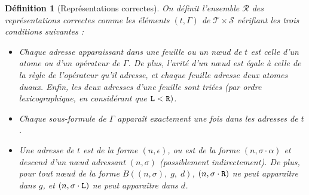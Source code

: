 \documentclass[11pt,a4paper]{article}
\newtheorem{definition}{Définition}
\newcommand*{\sequent}{\Gamma}
\newcommand*{\Left}{\textnormal{\texttt{L}}}
\newcommand*{\Right}{\textnormal{\texttt{R}}}
\newcommand*{\sequents}{\ensuremath{\mathcal{S}}}
\newcommand*{\trees}{\ensuremath{\mathcal{T}}}
\newcommand*{\representationslarge}{\ensuremath{\trees \times \sequents}}
\newcommand*{\representations}{\ensuremath{\mathcal{R}}}
\begin{document}
\begin{definition}[Représentations correctes]
    \label{def_rep}
    On définit l'ensemble \representations{} des représentations correctes comme les éléments $(t, \sequent)$ de $\representationslarge$ vérifiant les trois conditions suivantes :
    
    \begin{itemize}
    \item[(i) Bon adressage :]{ Chaque adresse apparaissant dans une feuille ou un n\oe ud de $t$ est celle d'un atome ou d'un opérateur de $\sequent$. De plus, l'arité d'un n\oe ud est égale à celle de la règle de l'opérateur qu'il adresse, et chaque feuille adresse deux atomes duaux. Enfin, les deux adresses d'une feuille sont triées (par ordre lexicographique, en considérant que $\Left < \Right)$.}
    
    \item[(ii) Linéarité :]{ Chaque sous-formule de $\sequent$ apparaît exactement une fois dans les adresses de $t$.}

    \item[(iii) Descendance :]{ Une adresse de $t$ est de la forme $(n, \epsilon)$, ou est de la forme $(n, \sigma \cdot \alpha)$ et descend d'un n\oe ud adressant $(n, \sigma)$ (possiblement indirectement). De plus, pour tout n\oe ud de la forme $B((n, \sigma), \; g, \; d)$, $(n, \sigma \cdot \Right)$ ne peut apparaître dans $g$, et $(n, \sigma \cdot \Left)$ ne peut apparaître dans $d$.}
    \end{itemize}
\end{definition}
\end{document}
